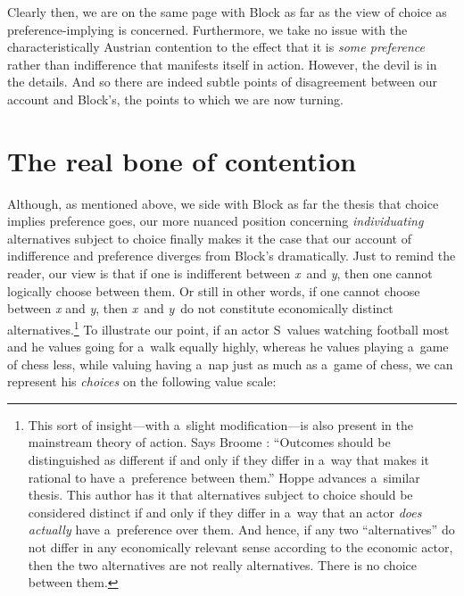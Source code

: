 Clearly then, we are on the same page with Block as far as the view of choice as preference-implying is concerned. Furthermore, we take no issue with the characteristically Austrian contention to the effect that it is \textit{some preference} rather than indifference that manifests itself in action. However, the devil is in the details. And so there are indeed subtle points of disagreement between our account and Block's, the points to which we are now turning.



\section{The real bone of contention}

Although, as mentioned above, we side with Block as far the thesis that choice implies preference goes, our more nuanced position concerning \textit{individuating} alternatives subject to choice finally makes it the case that our account of indifference and preference diverges from Block's dramatically. Just to remind the reader, our view is that if one is indifferent between \textit{x}~and \textit{y}, then one cannot logically choose between them. Or still in other words, if one cannot choose between \textit{x} and \textit{y}, then \textit{x}~and \textit{y}~do not constitute economically distinct alternatives.\footnote{This sort of insight---with a~slight modification---is also present in the mainstream theory of action. Says Broome 
\parencite*[][p.103]{broome_weighing_1991}: %
 ``Outcomes should be distinguished as different if and only if they differ in a~way that makes it rational to have a~preference between them.'' Hoppe 
\parencite*[][]{hoppe_must_2005} %
 advances a~similar thesis. This author has it that alternatives subject to choice should be considered distinct if and only if they differ in a~way that an actor \textit{does actually} have a~preference over them. And hence, if any two ``alternatives'' do not differ in any economically relevant sense according to the economic actor, then the two alternatives are not really alternatives. There is no choice between them. } To illustrate our point, if an actor S~values watching football most and he values going for a~walk equally highly, whereas he values playing a~game of chess less, while valuing having a~nap just as much as a~game of chess, we can represent his \textit{choices} on the following value scale:



